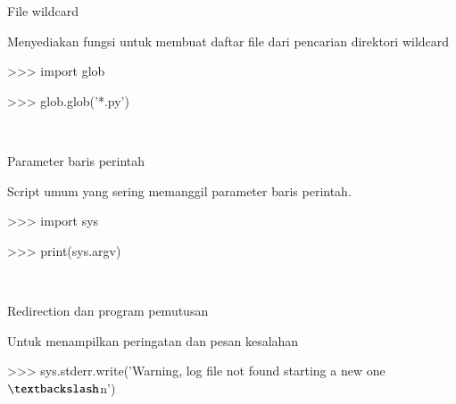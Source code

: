\vspace{14pt}
\noindent 
{\fontsize{14pt}{14pt}\selectfont File wildcard \\} \par
\noindent 
{\fontsize{14pt}{14pt}\selectfont Menyediakan fungsi untuk membuat daftar file dari pencarian direktori wildcard \\} \par
\vspace{14pt}
\noindent 
{\fontsize{14pt}{14pt}\selectfont >>> import glob \\} \par
\vspace{14pt}
\noindent 
{\fontsize{14pt}{14pt}\selectfont >>> glob.glob('*.py') \\} \par
\noindent 
{\fontsize{14pt}{14pt} \\} \par
\vspace{14pt}
\noindent 
{\fontsize{14pt}{14pt}\selectfont Parameter baris perintah  \\} \par
\noindent 
{\fontsize{14pt}{14pt}\selectfont Script umum yang sering memanggil parameter baris perintah.  \\} \par
\vspace{14pt}
\noindent 
{\fontsize{14pt}{14pt}\selectfont >>> import sys \\} \par
\vspace{14pt}
\noindent 
{\fontsize{14pt}{14pt}\selectfont >>> print(sys.argv) \\} \par
\noindent 
{\fontsize{14pt}{14pt} \\} \par
\vspace{14pt}
\noindent 
{\fontsize{14pt}{14pt}\selectfont Redirection dan program pemutusan \\} \par
\noindent 
{\fontsize{14pt}{14pt}\selectfont Untuk menampilkan peringatan dan pesan kesalahan \\} \par
\vspace{14pt}
\noindent 
{\fontsize{14pt}{14pt}\selectfont >>> sys.stderr.write('Warning, log file not found starting a new one $  \textbackslash  $n') \\} \par
